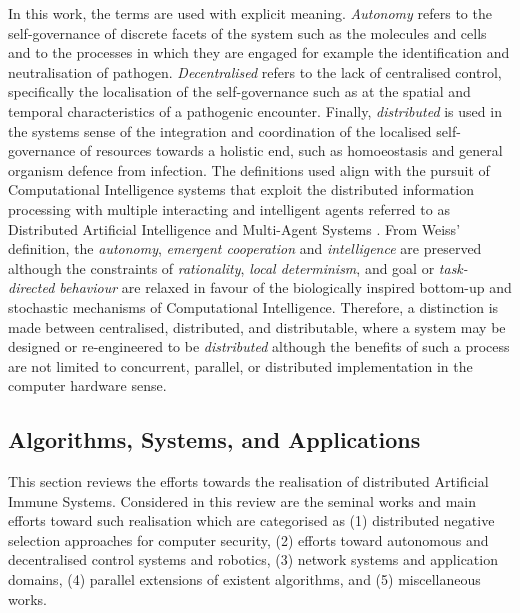 In this work, the terms are used with explicit meaning. \emph{Autonomy} refers to the self-governance of discrete facets of the system such as the molecules and cells and to the processes in which they are engaged for example the identification and neutralisation of pathogen. \emph{Decentralised} refers to the lack of centralised control, specifically the localisation of the self-governance such as at the spatial and temporal characteristics of a pathogenic encounter. Finally, \emph{distributed} is used in the systems sense of the integration and coordination of the localised self-governance of resources towards a holistic end, such as homoeostasis and general organism defence from infection. The definitions used align with the pursuit of Computational Intelligence systems that exploit the distributed information processing with multiple interacting and intelligent agents referred to as Distributed Artificial Intelligence and Multi-Agent Systems \cite{Weiss1999}. From Weiss' definition, the \emph{autonomy}, \emph{emergent cooperation} and \emph{intelligence} are preserved although the constraints of \emph{rationality}, \emph{local determinism}, and goal or \emph{task-directed behaviour} are relaxed in favour of the biologically inspired bottom-up and stochastic mechanisms of Computational Intelligence. Therefore, a distinction is made between centralised, distributed, and distributable, where a system may be designed or re-engineered to be \emph{distributed} although the benefits of such a process are not limited to concurrent, parallel, or distributed implementation in the computer hardware sense. 

%
%
\subsection{Algorithms, Systems, and Applications}
\label{subsec:distrb:review}
This section reviews the efforts towards the realisation of distributed Artificial Immune Systems. Considered in this review are the seminal works and main efforts toward such realisation which are categorised as (1) distributed negative selection approaches for computer security, (2) efforts toward autonomous and decentralised control systems and robotics, (3) network systems and application domains, (4) parallel extensions of existent algorithms, and (5) miscellaneous works.

